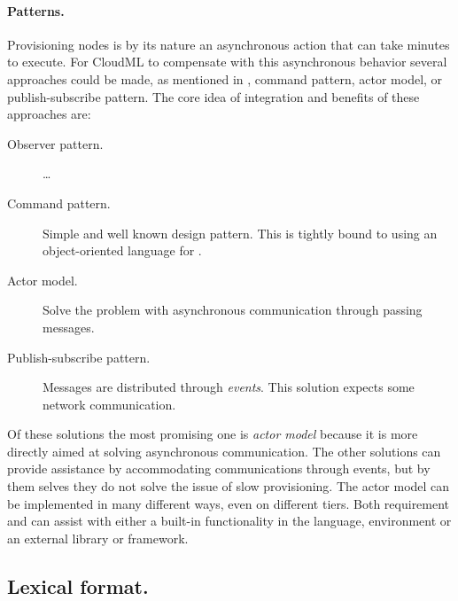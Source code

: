 \paragraph{Patterns.}

Provisioning nodes is by its nature an asynchronous action that can take minutes to execute.
For CloudML to compensate with this asynchronous behavior several approaches could be made,
as mentioned in , \eg command pattern, actor model,
or publish-subscribe pattern.
The core idea of integration and benefits of these approaches are:
\begin{description}
  \item[Observer pattern.] \ldots
  \item[Command pattern.] Simple and well known design pattern. 
    This is tightly bound to using an object-oriented language for .
  \item[Actor model.] Solve the problem with asynchronous communication through passing messages.
  \item[Publish-subscribe pattern.] Messages are distributed through \emph{events}.
    This solution expects some network communication.
\end{description}
Of these solutions the most promising one is \emph{actor model} because it is more directly aimed
at solving asynchronous communication.
The other solutions can provide assistance by accommodating communications through events, 
but by them selves they do not solve the issue of slow provisioning.
The actor model can be implemented in many different ways, even on different tiers.
Both requirement  and  can assist with either
a built-in functionality in the language, environment or an external library or framework.

\subsection{Lexical format.}

